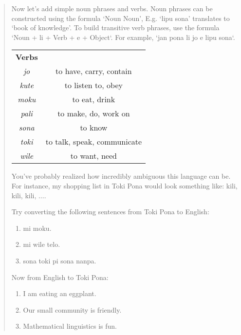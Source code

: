 \documentclass[10.5pt]{article}
\begin{document}
\begin{quote}
Now let's add simple noun phrases and verbs. Noun phrases can be constructed using 
the formula `Noun Noun', E.g. `lipu sona' translates to `book of knowledge'. 
To build transitive verb phrases, use the formula `Noun + li + Verb + e + Object`.
For example, `jan pona li jo e lipu sona`.

\medskip
\begin{tabular}{c c}
{\bf Verbs}   &                               \\
\emph{jo}     & to have, carry, contain       \\ 
\emph{kute}   & to listen to, obey            \\
\emph{moku}   & to eat, drink                 \\
\emph{pali}   & to make, do, work on          \\         
\emph{sona}   & to know                       \\
\emph{toki}   & to talk, speak, communicate   \\  
\emph{wile}   & to want, need                 \\  
\end{tabular}
\medskip

You've probably realized how incredibly ambiguous this language can be. For instance, 
my shopping list in Toki Pona would look something like: kili, kili, kili, $\dots$. 

Try converting the following sentences from Toki Pona to English:
\begin{enumerate}
  \item mi moku.
  \item mi wile telo.
  \item sona toki pi sona nanpa.
\end{enumerate}

Now from English to Toki Pona:
\begin{enumerate}
  \item I am eating an eggplant.
  \item Our small community is friendly.
  \item Mathematical linguistics is fun.
\end{enumerate}
\end{quote}
\end{document}
